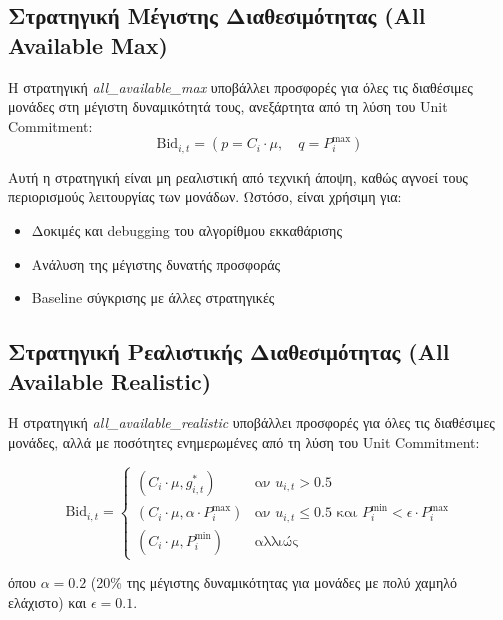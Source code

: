 \subsection{Στρατηγική Μέγιστης Διαθεσιμότητας (All Available Max)}
\label{subsec:strategy-all-available-max}

Η στρατηγική \textit{all\_available\_max} υποβάλλει προσφορές για όλες τις διαθέσιμες μονάδες στη μέγιστη δυναμικότητά τους, ανεξάρτητα από τη λύση του Unit Commitment:
\begin{equation}
\label{eq:all-available-max-bid}
\text{Bid}_{i,t} = \left( p = C_i \cdot \mu, \quad q = P_i^{\max} \right)
\end{equation}

Αυτή η στρατηγική είναι μη ρεαλιστική από τεχνική άποψη, καθώς αγνοεί τους περιορισμούς λειτουργίας των μονάδων. Ωστόσο, είναι χρήσιμη για:
\begin{itemize}
    \item Δοκιμές και debugging του αλγορίθμου εκκαθάρισης
    \item Ανάλυση της μέγιστης δυνατής προσφοράς
    \item Baseline σύγκρισης με άλλες στρατηγικές
\end{itemize}

\subsection{Στρατηγική Ρεαλιστικής Διαθεσιμότητας (All Available Realistic)}
\label{subsec:strategy-all-available-realistic}

Η στρατηγική \textit{all\_available\_realistic} υποβάλλει προσφορές για όλες τις διαθέσιμες μονάδες, αλλά με ποσότητες ενημερωμένες από τη λύση του Unit Commitment:

\begin{equation}
\label{eq:all-available-realistic-bid}
\text{Bid}_{i,t} = 
\begin{cases}
\left( C_i \cdot \mu, g_{i,t}^* \right) & \text{αν } u_{i,t} > 0.5 \\
\left( C_i \cdot \mu, \alpha \cdot P_i^{\max} \right) & \text{αν } u_{i,t} \leq 0.5 \text{ και } P_i^{\min} < \epsilon \cdot P_i^{\max} \\
\left( C_i \cdot \mu, P_i^{\min} \right) & \text{αλλιώς}
\end{cases}
\end{equation}

όπου $\alpha = 0.2$ (20\% της μέγιστης δυναμικότητας για μονάδες με πολύ χαμηλό ελάχιστο) και $\epsilon = 0.1$.

